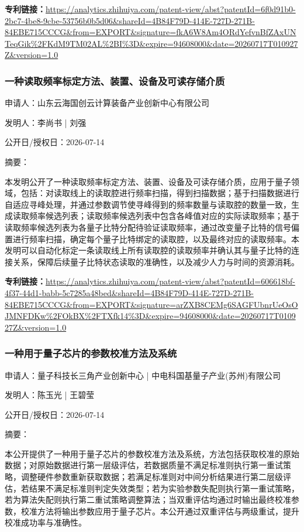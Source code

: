 \documentclass[12pt,a4paper]{ctexart}
\begin{document}
\noindent\textbf{专利链接：}\url{https://analytics.zhihuiya.com/patent-view/abst?patentId=6f0d91b0-2bc7-4be8-9cbe-53756b0b5d06&shareId=4B84F79D-414E-727D-271B-84EBE715CCCG&from=EXPORT&signature=fkA6W8Am4ORdYefvnBfZAxUNTeqGik%2FKdM9TM02AL%2BI%3D&expire=94608000&date=20260717T010927Z&version=1.0}

\subsubsection{ 一种读取频率标定方法、装置、设备及可读存储介质 }

申请人：山东云海国创云计算装备产业创新中心有限公司

发明人：李尚书 | 刘强

公开日/授权日：2026-07-14

摘要：

本发明公开了一种读取频率标定方法、装置、设备及可读存储介质，应用于量子领域，包括：对读取线上的读取腔进行频率扫描，得到扫描数据；基于扫描数据进行自适应寻峰处理，并通过参数调节使寻峰得到的频率数量与读取腔的数量一致，生成读取频率候选列表；读取频率候选列表中包含各峰值对应的实际读取频率；基于读取频率候选列表为各量子比特分配待验证读取频率，通过改变量子比特的信号偏置进行频率扫描，确定每个量子比特绑定的读取腔，以及最终对应的读取频率。本发明可以自动化标定一条读取线上所有读取腔的读取频率并确认其与量子比特的连接关系，保障后续量子比特状态读取的准确性，以及减少人力与时间的资源消耗。

\noindent\textbf{专利链接：}\url{https://analytics.zhihuiya.com/patent-view/abst?patentId=606618bf-4f37-44d1-babb-5c7285a48bed&shareId=4B84F79D-414E-727D-271B-84EBE715CCCG&from=EXPORT&signature=arZXB8CEMg6SAGFUbnrUeOsOJMNFDKw%2FOkBX%2FTXfk14%3D&expire=94608000&date=20260717T010927Z&version=1.0}

\subsubsection{ 一种用于量子芯片的参数校准方法及系统 }

申请人：量子科技长三角产业创新中心 | 中电科国基量子产业(苏州)有限公司

发明人：陈玉光 | 王碧莹

公开日/授权日：2026-07-14

摘要：

本公开提供了一种用于量子芯片的参数校准方法及系统，方法包括获取校准的原始数据；对原始数据进行第一层级评估，若数据质量不满足标准则执行第一重试策略，调整硬件参数重新获取数据；若满足标准则对中间分析结果进行第二层级评估，若结果不满足标准则判定失效类型；若为实验参数失配则执行第一重试策略，若为算法失配则执行第二重试策略调整算法；当双重评估均通过时输出最终校准参数，校准方法将输出参数应用于量子芯片。本公开通过双重评估与两级重试，提升校准成功率与准确性。
\end{document}
